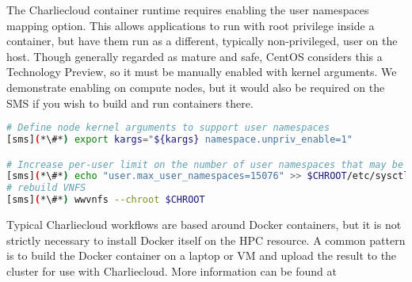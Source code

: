 The Charliecloud container runtime requires enabling the user namespaces mapping
option. This allows applications to run with root privilege inside a container, 
but have them run as a different, typically non-privileged, user on the host.
Though generally regarded as mature and safe, CentOS considers this a Technology
Preview, so it must be manually enabled with kernel arguments. We demonstrate
enabling on compute nodes, but it would also be required on the SMS if you wish
to build and run containers there.

\begin{lstlisting}[language=bash,keywords={},upquote=true]
# Define node kernel arguments to support user namespaces
[sms](*\#*) export kargs="${kargs} namespace.unpriv_enable=1"

# Increase per-user limit on the number of user namespaces that may be created
[sms](*\#*) echo "user.max_user_namespaces=15076" >> $CHROOT/etc/sysctl.conf
# rebuild VNFS
[sms](*\#*) wwvnfs --chroot $CHROOT
\end{lstlisting}

\begin{center}
\begin{tcolorbox}[]
\small
Typical Charliecloud workflows are based around Docker containers, but it is not
strictly necessary to install Docker itself on the HPC resource. A common
pattern is to build the Docker container on a laptop or VM and upload the result
to the cluster for use with Charliecloud. More information can be found at
\href{https://hpc.github.io/charliecloud/}
    {\color{blue}{https://hpc.github.io/charliecloud/}}
\end{tcolorbox}
\end{center}

